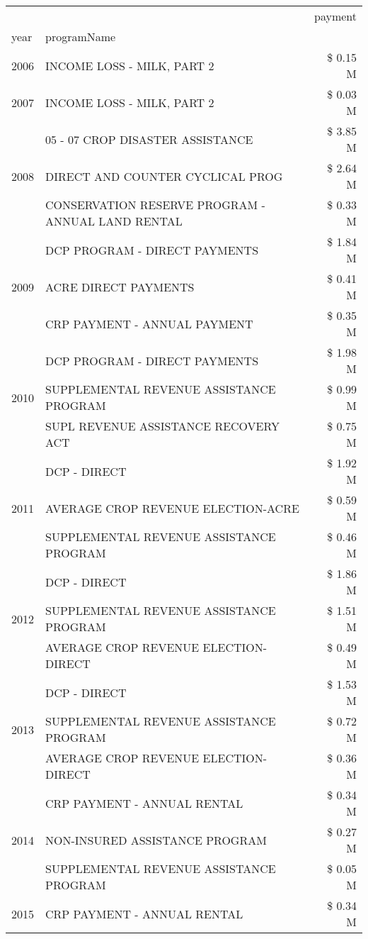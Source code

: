 \begin{tabular}{llr}
\toprule
 &  & payment \\
year & programName &  \\
\midrule
2006 & INCOME LOSS - MILK, PART 2 & \$ 0.15 M \\
\cline{1-3}
2007 & INCOME LOSS - MILK, PART 2 & \$ 0.03 M \\
\cline{1-3}
\multirow[t]{3}{*}{2008} & 05 - 07 CROP DISASTER ASSISTANCE & \$ 3.85 M \\
 & DIRECT AND COUNTER CYCLICAL PROG & \$ 2.64 M \\
 & CONSERVATION RESERVE PROGRAM - ANNUAL LAND RENTAL & \$ 0.33 M \\
\cline{1-3}
\multirow[t]{3}{*}{2009} & DCP PROGRAM - DIRECT PAYMENTS & \$ 1.84 M \\
 & ACRE DIRECT PAYMENTS & \$ 0.41 M \\
 & CRP PAYMENT - ANNUAL PAYMENT & \$ 0.35 M \\
\cline{1-3}
\multirow[t]{3}{*}{2010} & DCP PROGRAM - DIRECT PAYMENTS & \$ 1.98 M \\
 & SUPPLEMENTAL REVENUE ASSISTANCE PROGRAM & \$ 0.99 M \\
 & SUPL REVENUE ASSISTANCE RECOVERY ACT & \$ 0.75 M \\
\cline{1-3}
\multirow[t]{3}{*}{2011} & DCP - DIRECT & \$ 1.92 M \\
 & AVERAGE CROP REVENUE ELECTION-ACRE & \$ 0.59 M \\
 & SUPPLEMENTAL REVENUE ASSISTANCE PROGRAM & \$ 0.46 M \\
\cline{1-3}
\multirow[t]{3}{*}{2012} & DCP - DIRECT & \$ 1.86 M \\
 & SUPPLEMENTAL REVENUE ASSISTANCE PROGRAM & \$ 1.51 M \\
 & AVERAGE CROP REVENUE ELECTION-DIRECT & \$ 0.49 M \\
\cline{1-3}
\multirow[t]{3}{*}{2013} & DCP - DIRECT & \$ 1.53 M \\
 & SUPPLEMENTAL REVENUE ASSISTANCE PROGRAM & \$ 0.72 M \\
 & AVERAGE CROP REVENUE ELECTION-DIRECT & \$ 0.36 M \\
\cline{1-3}
\multirow[t]{3}{*}{2014} & CRP PAYMENT - ANNUAL RENTAL & \$ 0.34 M \\
 & NON-INSURED ASSISTANCE PROGRAM & \$ 0.27 M \\
 & SUPPLEMENTAL REVENUE ASSISTANCE PROGRAM & \$ 0.05 M \\
\cline{1-3}
\multirow[t]{3}{*}{2015} & CRP PAYMENT - ANNUAL RENTAL & \$ 0.34 M \\

\end{tabular}
